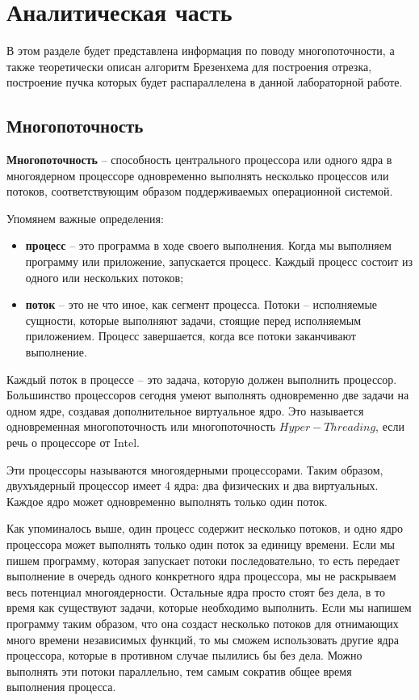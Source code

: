 \chapter{Аналитическая часть}
В этом разделе будет представлена информация по поводу многопоточности, а также теоретически описан алгоритм Брезенхема для построения отрезка, построение пучка которых будет распараллелена в данной лабораторной работе.


\section{Многопоточность}

\textbf{Многопоточность} \cite{threads} -- способность центрального процессора или одного ядра в многоядерном процессоре одновременно выполнять несколько процессов или потоков, соответствующим образом поддерживаемых операционной системой.

Упомянем важные определения:
\begin{itemize}
	\item \textbf{процесс} -- это программа в ходе своего выполнения. Когда мы выполняем программу или приложение, запускается процесс. Каждый процесс состоит из одного или нескольких потоков;

	\item \textbf{поток} -- это не что иное, как сегмент процесса. Потоки -- исполняемые сущности, которые выполняют задачи, стоящие перед исполняемым приложением. Процесс завершается, когда все потоки заканчивают выполнение.
\end{itemize}

Каждый поток в процессе -- это задача, которую должен выполнить процессор. Большинство процессоров сегодня умеют выполнять одновременно две задачи на одном ядре, создавая дополнительное виртуальное ядро. Это называется одновременная многопоточность или многопоточность $Hyper-Threading$, если речь о процессоре от Intel. 

Эти процессоры называются многоядерными процессорами. Таким образом, двухъядерный процессор имеет 4 ядра: два физических и два виртуальных. Каждое ядро может одновременно выполнять только один поток.

Как упоминалось выше, один процесс содержит несколько потоков, и одно ядро процессора может выполнять только один поток за единицу времени. Если мы пишем программу, которая запускает потоки последовательно, то есть передает выполнение в очередь одного конкретного ядра процессора, мы не раскрываем весь потенциал многоядерности. Остальные ядра просто стоят без дела, в то время как существуют задачи, которые необходимо выполнить. Если мы напишем программу таким образом, что она создаст несколько потоков для отнимающих много времени независимых функций, то мы сможем использовать другие ядра процессора, которые в противном случае пылились бы без дела. Можно выполнять эти потоки параллельно, тем самым сократив общее время выполнения процесса.


